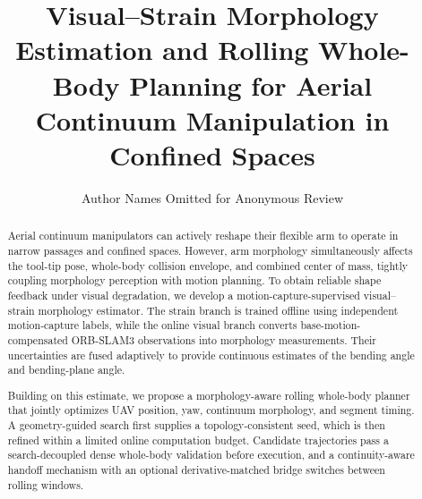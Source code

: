 \documentclass[journal,twoside]{IEEEtran}
\begin{document}
\title{Visual--Strain Morphology Estimation and Rolling Whole-Body Planning for Aerial Continuum Manipulation in Confined Spaces}
\author{Author Names Omitted for Anonymous Review}
\maketitle


\begin{abstract}
Aerial continuum manipulators can actively reshape their flexible arm to operate in narrow passages and confined spaces. However, arm morphology simultaneously affects the tool-tip pose, whole-body collision envelope, and combined center of mass, tightly coupling morphology perception with motion planning. To obtain reliable shape feedback under visual degradation, we develop a motion-capture-supervised visual--strain morphology estimator. The strain branch is trained offline using independent motion-capture labels, while the online visual branch converts base-motion-compensated ORB-SLAM3 observations into morphology measurements. Their uncertainties are fused adaptively to provide continuous estimates of the bending angle and bending-plane angle.

Building on this estimate, we propose a morphology-aware rolling whole-body planner that jointly optimizes UAV position, yaw, continuum morphology, and segment timing. A geometry-guided search first supplies a topology-consistent seed, which is then refined within a limited online computation budget. Candidate trajectories pass a search-decoupled dense whole-body validation before execution, and a continuity-aware handoff mechanism with an optional derivative-matched bridge switches between rolling windows.


\end{abstract}
\end{document}
